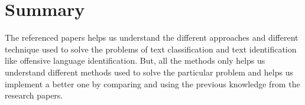 \documentclass[11pt,a4paper]{article}
\begin{document}
\section{Summary}
The referenced papers helps us understand the different approaches and different technique used to solve the problems of text classification and text identification like offensive language identification. But, all the methods only helps us understand different methods used to solve the particular problem and helps us implement a better one by comparing and using the previous knowledge from the research papers.



\end{document}

